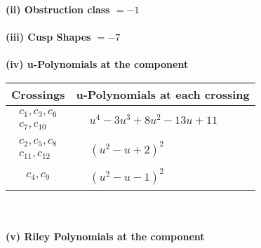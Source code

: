 \documentclass[1p]{elsarticle_modified}
\theoremstyle{definition}
\begin{document}
\flushleft \textbf{(ii) Obstruction class $= -1$}\\~\\
\flushleft \textbf{(iii) Cusp Shapes $= -7$}\\~\\
\newpage\renewcommand{\arraystretch}{1}
\flushleft \textbf{(iv) u-Polynomials at the component}\newline \\
\begin{tabular}{m{50pt}|m{274pt}}
Crossings & \hspace{64pt}u-Polynomials at each crossing \\
\hline $$\begin{aligned}c_{1},c_{3},c_{6}\\c_{7},c_{10}\end{aligned}$$&$\begin{aligned}
&u^4-3 u^3+8 u^2-13 u+11
\end{aligned}$\\
\hline $$\begin{aligned}c_{2},c_{5},c_{8}\\c_{11},c_{12}\end{aligned}$$&$\begin{aligned}
&(u^2- u+2)^2
\end{aligned}$\\
\hline $$\begin{aligned}c_{4},c_{9}\end{aligned}$$&$\begin{aligned}
&(u^2- u-1)^2
\end{aligned}$\\
\hline
\end{tabular}\\~\\
\newpage\renewcommand{\arraystretch}{1}
\flushleft \textbf{(v) Riley Polynomials at the component}\newline \\
\end{document}
